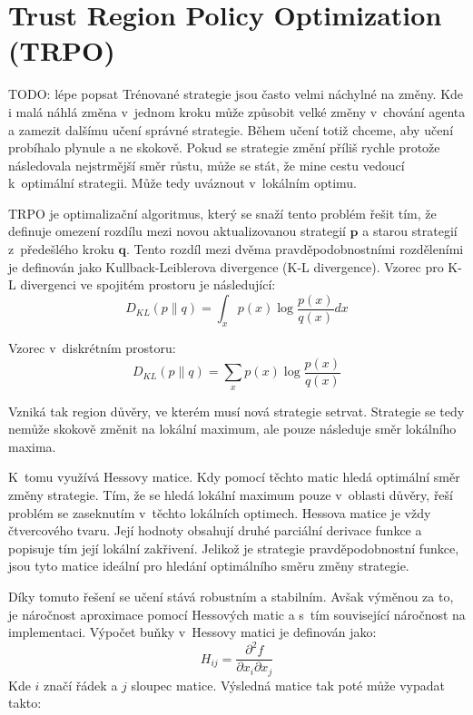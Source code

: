 \section{Trust Region Policy Optimization (TRPO)}\label{sec:trust-region-policy-optimization}
{\color{red}TODO: lépe popsat}
Trénované strategie jsou často velmi náchylné na změny.
Kde i malá náhlá změna v~jednom kroku může způsobit velké změny v~chování agenta a zamezit dalšímu učení správné strategie.
Během učení totiž chceme, aby učení probíhalo plynule a ne skokově.
Pokud se strategie změní příliš rychle protože následovala nejstrmější směr růstu, může se stát, že mine cestu vedoucí k~optimální strategii.
Může tedy uváznout v~lokálním optimu.

TRPO je optimalizační algoritmus, který se snaží tento problém řešit tím, že definuje omezení rozdílu mezi novou aktualizovanou strategií $\textbf{p}$ a starou strategií z~předešlého kroku $\textbf{q}$.
Tento rozdíl mezi dvěma pravděpodobnostními rozděleními je definován jako Kullback-Leiblerova divergence (K-L divergence)\cite{KL_divergence}.
Vzorec pro K-L divergenci ve spojitém prostoru je následující:
\begin{equation}
  D_{KL}(p \| q) = \int_x p(x) \log \frac{p(x)}{q(x)} dx
\end{equation}

Vzorec v~diskrétním prostoru:
\begin{equation}
  D_{KL}(p \| q) = \sum_x p(x) \log \frac{p(x)}{q(x)}
\end{equation}

Vzniká tak region důvěry, ve kterém musí nová strategie setrvat.
Strategie se tedy nemůže skokově změnit na lokální maximum, ale pouze následuje směr lokálního maxima.

K~tomu využívá Hessovy matice.
Kdy pomocí těchto matic hledá optimální směr změny strategie.
Tím, že se hledá lokální maximum pouze v~oblasti důvěry, řeší problém se zaseknutím v~těchto lokálních optimech.
Hessova matice je vždy čtvercového tvaru.
Její hodnoty obsahují druhé parciální derivace funkce a popisuje tím její lokální zakřivení.
Jelikož je strategie pravděpodobnostní funkce, jsou tyto matice ideální pro hledání optimálního směru změny strategie.

Díky tomuto řešení se učení stává robustním a stabilním.
Avšak výměnou za to, je náročnost aproximace pomocí Hessových matic a s~tím související náročnost na implementaci.
Výpočet buňky v~Hessovy matici je definován jako:
\begin{equation}
  H_{ij} = \frac{\partial^2 f}{\partial x_i \partial x_j}
\end{equation}
Kde $i$ značí řádek a $j$ sloupec matice.
Výsledná matice tak poté může vypadat takto:

